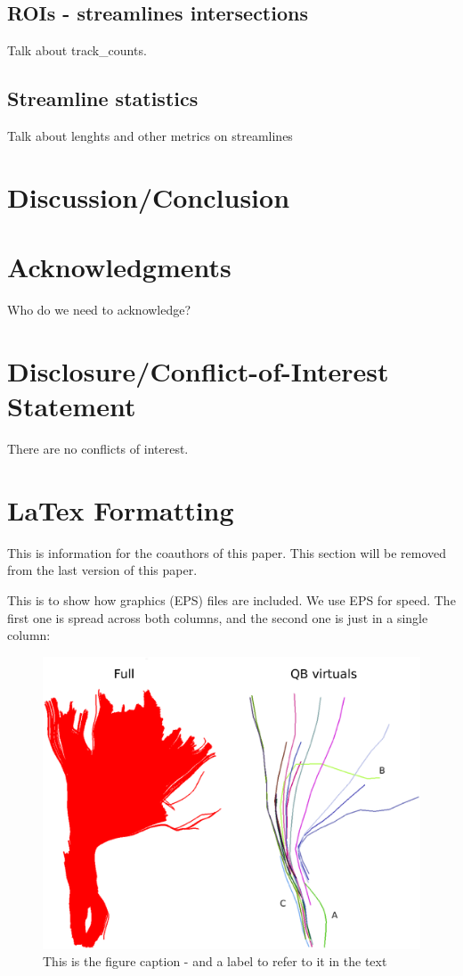 \documentclass{bioinfo}
\begin{document}
\subsection{ROIs - streamlines intersections}

Talk about track\_counts.

\subsection{Streamline statistics}

Talk about lenghts and other metrics on streamlines

\section{Discussion/Conclusion}

\section*{Acknowledgments}
Who do we need to acknowledge?

\section*{Disclosure/Conflict-of-Interest Statement}
There are no conflicts of interest.

\section{LaTex Formatting}

This is information for the coauthors of this paper. This section will be removed from the last version of this paper.

This is to show how graphics (EPS) files are included. We use EPS for
speed. The first one is spread across both columns, and the second one
is just in a single column:

\begin{figure}
\centerline{\includegraphics[width=160mm]{Figures/Fig_4_cst_simplification_relabeled_triple.eps}}
\caption{This is the figure caption - and a label to refer to it in the text \label{Fig:big_picture}}
\end{figure}
\end{document}
